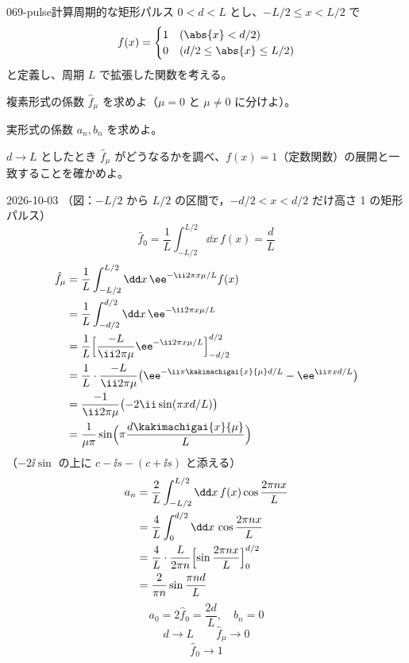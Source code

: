 \documentclass[uplatex,dvipdfmx,a4paper,11pt]{jsarticle}
\begin{document}
\begin{mondai}{069-pulse}{計算}{周期的な矩形パルス}
$0<d<L$ とし、$-L/2\le x<L/2$ で
\[
f(x)=\begin{cases}1&(\abs{x}<d/2)\\0&(d/2\le\abs{x}\le L/2)\end{cases}
\]
と定義し、周期 $L$ で拡張した関数を考える。
\begin{shoumon}
  \item 複素形式の係数 $\hat{f}_{\mu}$ を求めよ（$\mu=0$ と $\mu\neq0$ に分けよ）。
  \item 実形式の係数 $a_n,b_n$ を求めよ。
  \item $d\to L$ としたとき $\hat{f}_{\mu}$ がどうなるかを調べ、$f(x)=1$（定数関数）の展開と一致することを確かめよ。
\end{shoumon}
\begin{kotaeutsushi}{2026-10-03}
（図：$-L/2$ から $L/2$ の区間で，$-d/2<x<d/2$ だけ高さ 1 の矩形パルス）
\[ \hat{f}_0=\frac{1}{L}\int_{-L/2}^{L/2}\dd x\,f(x)=\frac{d}{L} \]
\begin{align*}
  \hat{f}_{\mu}&=\frac{1}{L}\int_{-L/2}^{L/2}\dd x\,\ee^{-\ii2\pi x\mu/L}f(x)\\
  &=\frac{1}{L}\int_{-d/2}^{d/2}\dd x\,\ee^{-\ii2\pi x\mu/L}\\
  &=\frac{1}{L}\Bigl[\frac{-L}{\ii2\pi\mu}\ee^{-\ii2\pi x\mu/L}\Bigr]_{-d/2}^{d/2}\\
  &=\frac{1}{L}\cdot\frac{-L}{\ii2\pi\mu}\bigl(\ee^{-\ii\pi\kakimachigai{x}{\mu}d/L}-\ee^{\ii\pi xd/L}\bigr)\\
  &=\frac{-1}{\ii2\pi\mu}\bigl(-2\ii\sin(\pi xd/L)\bigr)\\
  &=\frac{1}{\mu\pi}\sin\Bigl(\pi\frac{d\kakimachigai{x}{\mu}}{L}\Bigr)
\end{align*}
（$-2\ii\sin$ の上に $c-\ii s-(c+\ii s)$ と添える）
\begin{align*}
  a_n&=\frac{2}{L}\int_{-L/2}^{L/2}\dd x\,f(x)\cos\frac{2\pi nx}{L}\\
  &=\frac{4}{L}\int_{0}^{d/2}\dd x\,\cos\frac{2\pi nx}{L}\\
  &=\frac{4}{L}\cdot\frac{L}{2\pi n}\Bigl[\sin\frac{2\pi nx}{L}\Bigr]_{0}^{d/2}\\
  &=\frac{2}{\pi n}\sin\frac{\pi nd}{L}
\end{align*}
\[ a_0=2\hat{f}_0=\frac{2d}{L},\quad b_n=0 \]
\[ d\to L\qquad\hat{f}_{\mu}\to0 \]
\[ \hat{f}_0\to1 \]
\end{kotaeutsushi}
\end{mondai}
\end{document}
